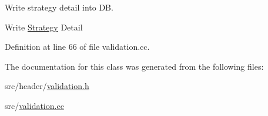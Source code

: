 Write strategy detail into D\-B. 

Write \hyperlink{classStrategy}{Strategy} Detail 

Definition at line 66 of file validation.\-cc.



The documentation for this class was generated from the following files\-:\begin{DoxyCompactItemize}
\item 
src/header/\hyperlink{validation_8h}{validation.\-h}\item 
src/\hyperlink{validation_8cc}{validation.\-cc}\end{DoxyCompactItemize}
